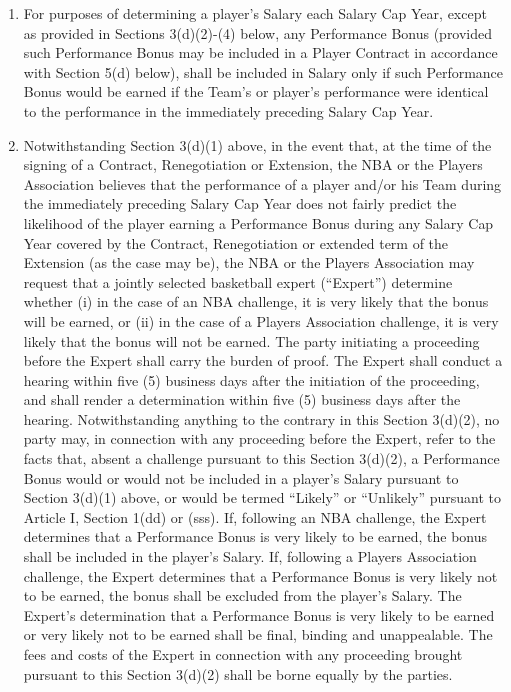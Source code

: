 \documentclass[
]{book}
\providecommand{\tightlist}{%
  \setlength{\itemsep}{0pt}\setlength{\parskip}{0pt}}
\begin{document}
\begin{enumerate}
  \begin{enumerate}
  \def\labelenumii{(\arabic{enumii})}
  \tightlist
  \item
    For purposes of determining a player's Salary each Salary Cap Year, except as provided in Sections 3(d)(2)-(4) below, any Performance Bonus (provided such Performance Bonus may be included in a Player Contract in accordance with Section 5(d) below), shall be included in Salary only if such Performance Bonus would be earned if the Team's or player's performance were identical to the performance in the immediately preceding Salary Cap Year.
  \item
    Notwithstanding Section 3(d)(1) above, in the event that, at the time of the signing of a Contract, Renegotiation or Extension, the NBA or the Players Association believes that the performance of a player and/or his Team during the immediately preceding Salary Cap Year does not fairly predict the likelihood of the player earning a Performance Bonus during any Salary Cap Year covered by the Contract, Renegotiation or extended term of the Extension (as the case may be), the NBA or the Players Association may request that a jointly selected basketball expert (``Expert'') determine whether (i) in the case of an NBA challenge, it is very likely that the bonus will be earned, or (ii) in the case of a Players Association challenge, it is very likely that the bonus will not be earned. The party initiating a proceeding before the Expert shall carry the burden of proof. The Expert shall conduct a hearing within five (5) business days after the initiation of the proceeding, and shall render a determination within five (5) business days after the hearing. Notwithstanding anything to the contrary in this Section 3(d)(2), no party may, in connection with any proceeding before the Expert, refer to the facts that, absent a challenge pursuant to this Section 3(d)(2), a Performance Bonus would or would not be included in a player's Salary pursuant to Section 3(d)(1) above, or would be termed ``Likely'' or ``Unlikely'' pursuant to Article I, Section 1(dd) or (sss). If, following an NBA challenge, the Expert determines that a Performance Bonus is very likely to be earned, the bonus shall be included in the player's Salary. If, following a Players Association challenge, the Expert determines that a Performance Bonus is very likely not to be earned, the bonus shall be excluded from the player's Salary. The Expert's determination that a Performance Bonus is very likely to be earned or very likely not to be earned shall be final, binding and unappealable. The fees and costs of the Expert in connection with any proceeding brought pursuant to this Section 3(d)(2) shall be borne equally by the parties.

\end{enumerate}
\end{enumerate}
\end{document}
